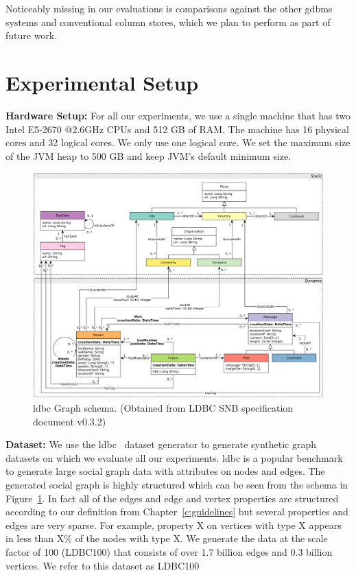 Noticeably missing in our evaluations is comparisons against the other \gls{gdbms} systems and conventional column stores, which we plan to perform as part of future work.

\section{Experimental Setup}

\noindent \textbf{Hardware Setup:} For all our experiments, we use a single machine that has two Intel E5-2670 @2.6GHz CPUs and 512 GB of RAM. The machine has 16 physical cores and 32 logical cores. We only use one logical core. We set the maximum size of the JVM heap to 500 GB and keep JVM's default minimum size.

\begin{figure}
	\centering
	\includegraphics[scale=0.42]{img/ldbc-schema}
	\captionsetup{justification=centering}
	\caption{\gls{ldbc} Graph schema. (Obtained from LDBC SNB specification document v0.3.2)}
	\label{fig:ldbc-schema}
\end{figure}

\noindent \textbf{Dataset:} We use the \gls{ldbc}~\cite{ldbc} dataset generator to generate synthetic graph datasets on which we evaluate all our experiments. \gls{ldbc} is a popular benchmark to generate large social graph data with attributes on nodes and edges. The generated social graph is highly structured which can be seen from the schema in Figure~\ref{fig:ldbc-schema}. In fact all of the edges and edge and vertex properties are structured according to our definition from Chapter~\ref{c:guidelines} but several properties and edges are very sparse. For example, property X on vertices with type X appears in less than X\% of the nodes with type X.  We generate the data at the scale factor of 100 (LDBC100) that consists of over 1.7 billion edges and 0.3 billion vertices. We refer to this dataset as LDBC100

